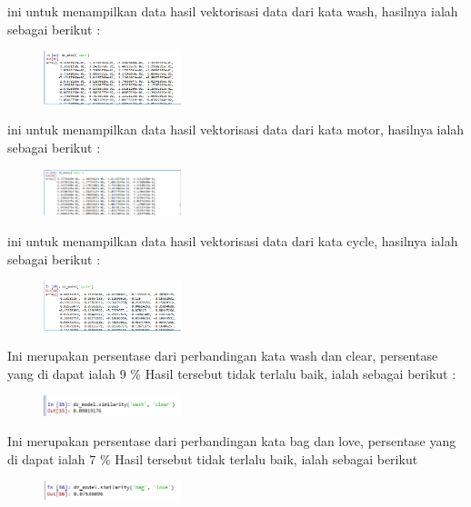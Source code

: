 \begin{enumerate}
	\hfill\break
	
	ini untuk menampilkan data hasil vektorisasi data dari kata wash, hasilnya ialah sebagai berikut : 
	\begin{figure}[H]
	\centering
		\includegraphics[width=4cm]{figures/1174095/tugas5/h10.PNG}
	\end{figure}

	\hfill\break
	
	ini untuk menampilkan data hasil vektorisasi data dari kata motor, hasilnya ialah sebagai berikut : 
	\begin{figure}[H]
	\centering
		\includegraphics[width=4cm]{figures/1174095/tugas5/h11.PNG}
	\end{figure}

	\hfill\break
	
	ini untuk menampilkan data hasil vektorisasi data dari kata cycle, hasilnya ialah sebagai berikut : 
	\begin{figure}[H]
	\centering
		\includegraphics[width=4cm]{figures/1174095/tugas5/h12.PNG}
	\end{figure}


	\hfill\break
	
	Ini merupakan persentase dari perbandingan kata wash dan clear, persentase yang di dapat ialah 9 \% Hasil tersebut tidak terlalu baik, ialah sebagai berikut : 
	\begin{figure}[H]
	\centering
		\includegraphics[width=4cm]{figures/1174095/tugas5/h13.PNG}
	\end{figure}

	\hfill\break
	
	Ini merupakan persentase dari perbandingan kata bag dan love, persentase yang di dapat ialah 7 \% Hasil tersebut tidak terlalu baik, ialah sebagai berikut 
	\begin{figure}[H]
	\centering
		\includegraphics[width=4cm]{figures/1174095/tugas5/h14.PNG}
	\end{figure}


\end{enumerate}
